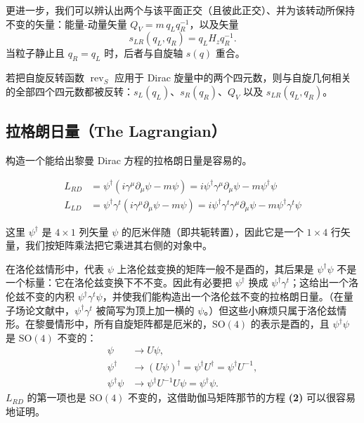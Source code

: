 更进一步，我们可以辨认出两个与该平面正交（且彼此正交）、并为该转动所保持不变的矢量：能量-动量矢量 $Q_{V}=m\,q_{L}q_{R}^{-1}$，以及矢量
\begin{equation}
s_{LR}(q_{L},q_{R})=q_{L}H_{z}q_{R}^{-1}.
\end{equation}
当粒子静止且 $q_{R}=q_{L}$ 时，后者与自旋轴 $s(q)$ 重合。

若把自旋反转函数 $\operatorname{rev}_{S}$ 应用于 Dirac 旋量中的两个四元数，则与自旋几何相关的全部四个四元数都被反转：$s_{L}(q_{L})$、$s_{R}(q_{R})$、$Q_{V}$ 以及 $s_{LR}(q_{L},q_{R})$。

\subsection{拉格朗日量（The Lagrangian）}

构造一个能给出黎曼 Dirac 方程的拉格朗日量是容易的。

\begin{keybox}
\begin{align}
L_{RD} &= \psi^{\dagger}(i\gamma^{\mu}\partial_{\mu}\psi-m\psi)
=i\psi^{\dagger}\gamma^{\mu}\partial_{\mu}\psi-m\psi^{\dagger}\psi \tag{Riemannian}\\
L_{LD} &= \psi^{\dagger}\gamma^{t}(i\gamma^{\mu}\partial_{\mu}\psi-m\psi)
=i\psi^{\dagger}\gamma^{t}\gamma^{\mu}\partial_{\mu}\psi-m\psi^{\dagger}\gamma^{t}\psi \tag{Lorentzian}
\end{align}
\end{keybox}

这里 $\psi^{\dagger}$ 是 $4\times1$ 列矢量 $\psi$ 的厄米伴随（即共轭转置），因此它是一个 $1\times4$ 行矢量，我们按矩阵乘法把它乘进其右侧的对象中。

在洛伦兹情形中，代表 $\psi$ 上洛伦兹变换的矩阵一般不是酉的，其后果是 $\psi^{\dagger}\psi$ 不是一个标量：它在洛伦兹变换下不不变。因此有必要把 $\psi^{\dagger}$ 换成 $\psi^{\dagger}\gamma^{t}$；这给出一个洛伦兹不变的内积 $\psi^{\dagger}\gamma^{t}\psi$，并使我们能构造出一个洛伦兹不变的拉格朗日量。（在量子场论文献中，$\psi^{\dagger}\gamma^{t}$ 被简写为顶上加一横的 $\psi$。）但这些小麻烦只属于洛伦兹情形。在黎曼情形中，所有自旋矩阵都是厄米的，$\mathrm{SO}(4)$ 的表示是酉的，且 $\psi^{\dagger}\psi$ 是 $\mathrm{SO}(4)$ 不变的：
\begin{align*}
\psi &\to U\psi,\\
\psi^{\dagger} &\to (U\psi)^{\dagger}=\psi^{\dagger}U^{\dagger}=\psi^{\dagger}U^{-1},\\
\psi^{\dagger}\psi &\to \psi^{\dagger}U^{-1}U\psi=\psi^{\dagger}\psi.
\end{align*}
$L_{RD}$ 的第一项也是 $\mathrm{SO}(4)$ 不变的，这借助伽马矩阵那节的方程 \textbf{(2)} 可以很容易地证明。

